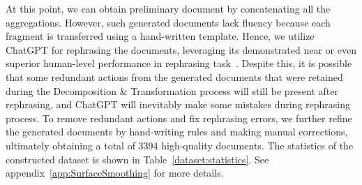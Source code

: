 At this point, we can obtain preliminary document by concatenating all the aggregations. 
However, such generated documents lack fluency because each fragment is transferred using a hand-written template. Hence, we utilize ChatGPT for rephrasing the documents, leveraging its demonstrated near or even superior human-level performance in rephrasing task~\cite{chui2023chatgpt}. 
Despite this, it is possible that some redundant actions from the generated documents that were retained during the Decomposition \& Transformation process will still be present after rephrasing, and ChatGPT will inevitably make some mistakes during rephrasing process. To remove redundant actions and fix rephrasing errors, we further refine the generated documents by hand-writing rules and making manual corrections, ultimately obtaining a total of 3394 high-quality documents. The statistics of the constructed dataset is shown in Table~\ref{dataset:statistics}. 
See appendix~\ref{app:SurfaceSmoothing} for more details. 




